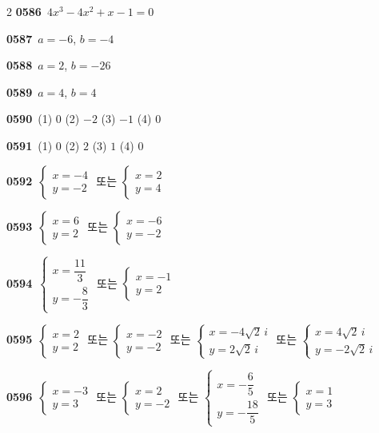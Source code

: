 \documentclass[10pt,a4paper]{article}
\begin{document}
\begin{multicols}{2}
\noindent\textbf{0586}\ $4x^3-4x^2+x-1=0$\par
\noindent\textbf{0587}\ $a=-6$, $b=-4$\par
\noindent\textbf{0588}\ $a=2$, $b=-26$\par
\noindent\textbf{0589}\ $a=4$, $b=4$\par
\noindent\textbf{0590}\ (1) $0$ \quad (2) $-2$ \quad (3) $-1$ \quad (4) $0$\par
\noindent\textbf{0591}\ (1) $0$ \quad (2) $2$ \quad (3) $1$ \quad (4) $0$\par
\noindent\textbf{0592}\ $\begin{cases} x=-4 \\ y=-2 \end{cases}$ 또는 $\begin{cases} x=2 \\ y=4 \end{cases}$\par
\noindent\textbf{0593}\ $\begin{cases} x=6 \\ y=2 \end{cases}$ 또는 $\begin{cases} x=-6 \\ y=-2 \end{cases}$\par
\noindent\textbf{0594}\ $\begin{cases} x=\dfrac{11}{3} \\[4pt] y=-\dfrac{8}{3} \end{cases}$ 또는 $\begin{cases} x=-1 \\ y=2 \end{cases}$\par
\noindent\textbf{0595}\ $\begin{cases} x=2 \\ y=2 \end{cases}$ 또는 $\begin{cases} x=-2 \\ y=-2 \end{cases}$ 또는 $\begin{cases} x=-4\sqrt{2}\,i \\ y=2\sqrt{2}\,i \end{cases}$ 또는 $\begin{cases} x=4\sqrt{2}\,i \\ y=-2\sqrt{2}\,i \end{cases}$\par
\noindent\textbf{0596}\ $\begin{cases} x=-3 \\ y=3 \end{cases}$ 또는 $\begin{cases} x=2 \\ y=-2 \end{cases}$ 또는 $\begin{cases} x=-\dfrac{6}{5} \\[4pt] y=-\dfrac{18}{5} \end{cases}$ 또는 $\begin{cases} x=1 \\ y=3 \end{cases}$\par

\end{multicols}
\end{document}
